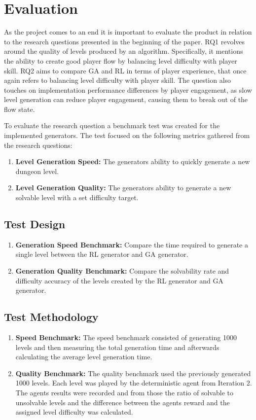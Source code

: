 \section{Evaluation}
As the project comes to an end it is important to evaluate the product in relation to the research questions presented in the
beginning of the paper. RQ1 revolves around the quality of levels produced by an algorithm. Specifically, it mentions the ability to create
good player flow by balancing level difficulty with player skill. RQ2 aims to compare GA and RL in terms of player experience, that once again
refers to balancing level difficulty with player skill. The question also touches on implementation performance differences by player engagement,
as slow level generation can reduce player engagement, causing them to break out of the flow state.

To evaluate the research question a benchmark test was created for the implemented generators. The test focused on the following metrics gathered from
the research questions:
\begin{enumerate}
  \item \textbf{Level Generation Speed:} The generators ability to quickly generate a new dungeon level.
  \item \textbf{Level Generation Quality:} The generators ability to generate a new solvable level with a set difficulty target.
\end{enumerate}

\subsection{Test Design}
\begin{enumerate}
  \item \textbf{Generation Speed Benchmark:} Compare the time required to generate a single level between the RL generator and GA generator.
  \item \textbf{Generation Quality Benchmark:} Compare the solvability rate and difficulty accuracy of the levels created by the RL generator and GA generator.
\end{enumerate}

\subsection{Test Methodology}
\begin{enumerate}
  \item \textbf{Speed Benchmark:} The speed benchmark consisted of generating 1000 levels and then measuring the total generation time
        and afterwards calculating the average level generation time.
  \item \textbf{Quality Benchmark:} The quality benchmark used the previously generated 1000 levels. Each level was played by the
        deterministic agent from Iteration 2. The agents results were recorded and from those the ratio of solvable to unsolvable levels and
        the difference between the agents reward and the assigned level difficulty was calculated.
\end{enumerate}

